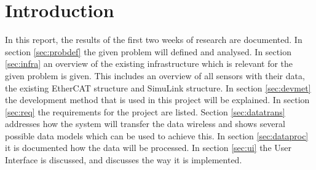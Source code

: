 \section{Introduction}
In this report, the results of the first two weeks of research are documented. In section \ref{sec:probdef} the given problem will defined and analysed. In section \ref{sec:infra} an overview of the existing infrastructure which is relevant for the given problem is given. This includes an overview of all sensors with their data, the existing EtherCAT structure and SimuLink structure. In section \ref{sec:devmet} the development method that is used in this project will be explained. In section \ref{sec:req} the requirements for the project are listed. Section \ref{sec:datatrans} addresses how the system will transfer the data wireless and shows several possible data models which can be used to achieve this. In section \ref{sec:dataproc} it is documented how the data will be processed. In section \ref{sec:ui} the User Interface is discussed, and discusses the way it is implemented. 